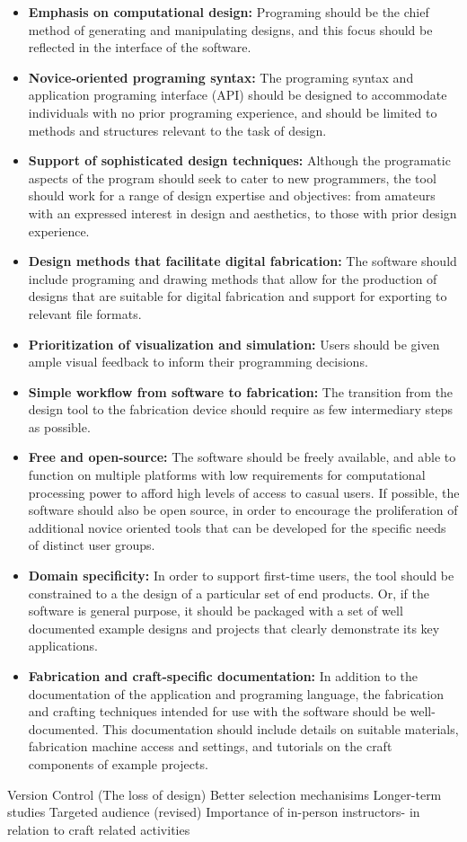 	\begin{itemize}
\item \textbf{Emphasis on computational design:} Programing should be the chief method of generating and manipulating designs, and this focus should be reflected in the interface of the software. 
\item \textbf{ Novice-oriented programing syntax:} The programing syntax and application programing interface (API) should be designed to accommodate individuals with no prior programing experience, and should be limited to methods and structures relevant to the task of design. 
\item \textbf{Support of sophisticated design techniques:} Although the programatic aspects of the program should seek to cater to new programmers, the tool should work for a range of design expertise and objectives:  from amateurs with an expressed interest in design and aesthetics, to those with prior design experience. 
\item \textbf {Design methods that facilitate digital fabrication:} The software should include programing and drawing methods that allow for the production of designs that are suitable for digital fabrication and support for exporting to relevant file formats. 
\item \textbf{ Prioritization of visualization and simulation:} Users  should be given ample visual feedback to inform their programming decisions.
\item \textbf{ Simple workflow from software to fabrication:} The transition from the design tool to the fabrication device should require as few intermediary steps as possible.
\item \textbf{ Free and open-source:} The software should be freely available, and able to function on multiple platforms with low requirements for computational processing power to afford high levels of access to casual users. If possible, the software should also be open source, in order to encourage the proliferation of additional novice oriented tools that can be developed for the specific needs of distinct user groups.
\item \textbf{Domain specificity:} In order to support first-time users, the tool should be constrained to a the design of a particular set of end products. Or, if the software is general purpose, it should be packaged with a set of well documented example designs and projects that clearly demonstrate its key applications. 
\item \textbf{Fabrication and craft-specific documentation:} In addition to the documentation of the application and programing language, the fabrication and crafting techniques intended for use with the software should be well-documented. This documentation should include details on suitable materials, fabrication machine access and settings, and tutorials on the craft components of example projects.
\end{itemize}
	
	Version Control (The loss of design)
	Better selection mechanisims
	Longer-term studies
Targeted audience (revised)
Importance of in-person instructors- in relation to craft related activities
